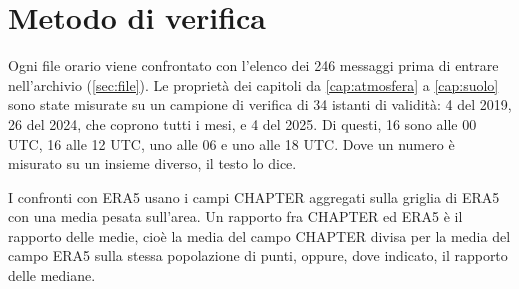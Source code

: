\chapter{Metodo di verifica}
\label{app:verifica}

Ogni file orario viene confrontato con l'elenco dei 246 messaggi prima di entrare nell'archivio
(\cref{sec:file}). Le proprietà dei capitoli da \ref{cap:atmosfera} a \ref{cap:suolo} sono state
misurate su un campione di verifica di 34 istanti di validità: 4 del 2019, 26 del 2024, che coprono
tutti i mesi, e 4 del 2025. Di questi, 16 sono alle 00 UTC, 16 alle 12 UTC, uno alle 06 e uno alle
18 UTC. Dove un numero è misurato su un insieme diverso, il testo lo dice.

I confronti con ERA5 usano i campi CHAPTER aggregati sulla griglia di ERA5 con una media pesata
sull'area. Un rapporto fra CHAPTER ed ERA5 è il rapporto delle medie, cioè la media del campo
CHAPTER divisa per la media del campo ERA5 sulla stessa popolazione di punti, oppure, dove indicato,
il rapporto delle mediane.
